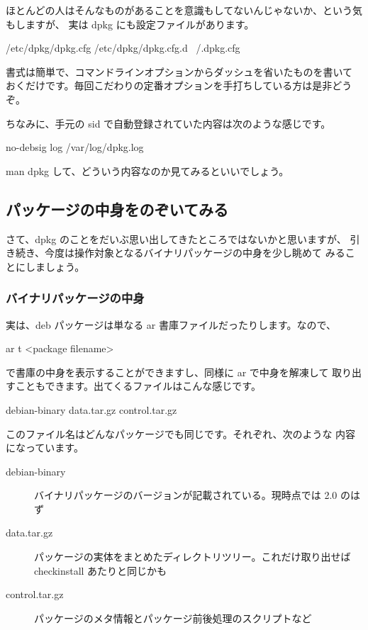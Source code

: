 \documentclass[mingoth,a4paper]{jsarticle}
\begin{document}
ほとんどの人はそんなものがあることを意識もしてないんじゃないか、という気もしますが、
実は dpkg にも設定ファイルがあります。

\begin{commandline}
/etc/dpkg/dpkg.cfg
/etc/dpkg/dpkg.cfg.d
~/.dpkg.cfg
\end{commandline}

書式は簡単で、コマンドラインオプションからダッシュを省いたものを書いて
おくだけです。毎回こだわりの定番オプションを手打ちしている方は是非どうぞ。

ちなみに、手元の sid で自動登録されていた内容は次のような感じです。

\begin{commandline}
no-debsig
log /var/log/dpkg.log
\end{commandline}

man dpkg して、どういう内容なのか見てみるといいでしょう。

\subsection{パッケージの中身をのぞいてみる}

さて、dpkg のことをだいぶ思い出してきたところではないかと思いますが、
引き続き、今度は操作対象となるバイナリパッケージの中身を少し眺めて
みることにしましょう。

\subsubsection{バイナリパッケージの中身}
実は、deb パッケージは単なる ar 書庫ファイルだったりします。なので、

\begin{commandline}
ar t <package filename>
\end{commandline}

で書庫の中身を表示することができますし、同様に ar で中身を解凍して
取り出すこともできます。出てくるファイルはこんな感じです。
\begin{commandline}
debian-binary
data.tar.gz
control.tar.gz
\end{commandline}

このファイル名はどんなパッケージでも同じです。それぞれ、次のような
内容になっています。

\begin{description}
  \item[debian-binary] バイナリパッケージのバージョンが記載されている。現時点では 2.0 のはず
  \item[data.tar.gz] パッケージの実体をまとめたディレクトリツリー。これだけ取り出せば checkinstall あたりと同じかも
  \item[control.tar.gz] パッケージのメタ情報とパッケージ前後処理のスクリプトなど
\end{description}
\end{document}
